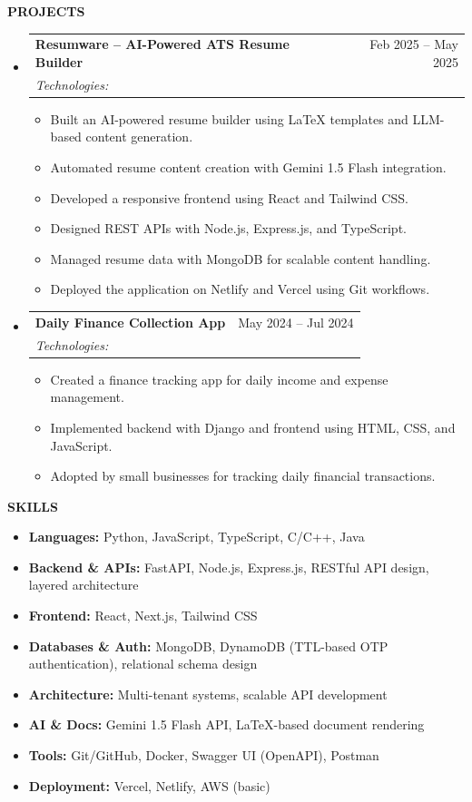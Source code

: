 \documentclass[a4paper,10pt]{article}
\makeatletter
\newcommand{\resheading}[1]{
  \vspace{8pt}
  {\color{black} \textbf{\large #1}}
  \vspace{-5pt}
  \hrulefill
  \vspace{3pt}
}
\newcommand{\ressubheading}[4]{
  \begin{tabular*}{\textwidth}{l@{\extracolsep{\fill}}r}
    \textbf{#1} & #2 \\
    \textit{\small #3} & \textit{\small #4} \\
  \end{tabular*}\vspace{-5pt}
}
\newcommand{\resitem}[1]{
  \item \small{
    {#1 \vspace{-2pt}}
  }
}
\makeatother
\begin{document}
\resheading{PROJECTS}
\begin{itemize}[leftmargin=*,nosep]
\item[] \ressubheading{Resumware – AI-Powered ATS Resume Builder}{Feb 2025 – May 2025}{Technologies: }{}
\begin{itemize}[leftmargin=12pt,nosep,topsep=2pt]
  \resitem{Built an AI-powered resume builder using LaTeX templates and LLM-based content generation.}
  \resitem{Automated resume content creation with Gemini 1.5 Flash integration.}
  \resitem{Developed a responsive frontend using React and Tailwind CSS.}
  \resitem{Designed REST APIs with Node.js, Express.js, and TypeScript.}
  \resitem{Managed resume data with MongoDB for scalable content handling.}
  \resitem{Deployed the application on Netlify and Vercel using Git workflows.}
\end{itemize}
\item[] \ressubheading{Daily Finance Collection App}{May 2024 – Jul 2024}{Technologies: }{}
\begin{itemize}[leftmargin=12pt,nosep,topsep=2pt]
  \resitem{Created a finance tracking app for daily income and expense management.}
  \resitem{Implemented backend with Django and frontend using HTML, CSS, and JavaScript.}
  \resitem{Adopted by small businesses for tracking daily financial transactions.}
\end{itemize}
\end{itemize}

\resheading{SKILLS}
\begin{itemize}[leftmargin=12pt,nosep,topsep=2pt]
  \item[] \small \textbf{Languages:} Python, JavaScript, TypeScript, C/C++, Java
  \item[] \small \textbf{Backend \& APIs:} FastAPI, Node.js, Express.js, RESTful API design, layered architecture
  \item[] \small \textbf{Frontend:} React, Next.js, Tailwind CSS
  \item[] \small \textbf{Databases \& Auth:} MongoDB, DynamoDB (TTL-based OTP authentication), relational schema design
  \item[] \small \textbf{Architecture:} Multi-tenant systems, scalable API development
  \item[] \small \textbf{AI \& Docs:} Gemini 1.5 Flash API, LaTeX-based document rendering
  \item[] \small \textbf{Tools:} Git/GitHub, Docker, Swagger UI (OpenAPI), Postman
  \item[] \small \textbf{Deployment:} Vercel, Netlify, AWS (basic)
\end{itemize}
\end{document}
